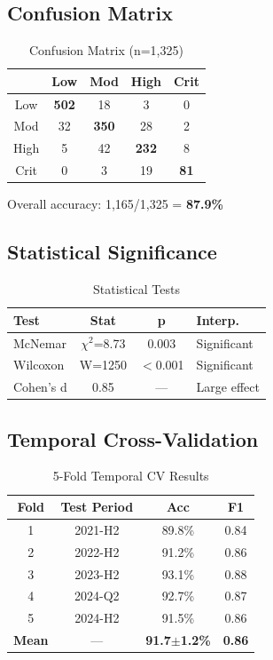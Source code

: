 \documentclass[journal,10pt,twoside]{IEEEtran}
\begin{document}
\subsection{Confusion Matrix}

\begin{table}[h]
\centering
\caption{Confusion Matrix (n=1,325)}
\begin{tabular}{c|cccc}
 & Low & Mod & High & Crit \\
\hline
Low & \textbf{502} & 18 & 3 & 0 \\
Mod & 32 & \textbf{350} & 28 & 2 \\
High & 5 & 42 & \textbf{232} & 8 \\
Crit & 0 & 3 & 19 & \textbf{81} \\
\end{tabular}
\end{table}

Overall accuracy: 1,165/1,325 = \textbf{87.9\%}

\subsection{Statistical Significance}

\begin{table}[h]
\centering
\caption{Statistical Tests}
\begin{tabular}{|l|c|c|l|}
\hline
\textbf{Test} & \textbf{Stat} & \textbf{p} & \textbf{Interp.} \\
\hline
McNemar & $\chi^2$=8.73 & 0.003 & Significant \\
Wilcoxon & W=1250 & $<$0.001 & Significant \\
Cohen's d & 0.85 & — & Large effect \\
\hline
\end{tabular}
\end{table}

\subsection{Temporal Cross-Validation}

\begin{table}[h]
\centering
\caption{5-Fold Temporal CV Results}
\begin{tabular}{|c|c|c|c|}
\hline
\textbf{Fold} & \textbf{Test Period} & \textbf{Acc} & \textbf{F1} \\
\hline
1 & 2021-H2 & 89.8\% & 0.84 \\
2 & 2022-H2 & 91.2\% & 0.86 \\
3 & 2023-H2 & 93.1\% & 0.88 \\
4 & 2024-Q2 & 92.7\% & 0.87 \\
5 & 2024-H2 & 91.5\% & 0.86 \\
\hline
\textbf{Mean} & — & \textbf{91.7$\pm$1.2\%} & \textbf{0.86} \\
\hline
\end{tabular}
\end{table}
\end{document}

